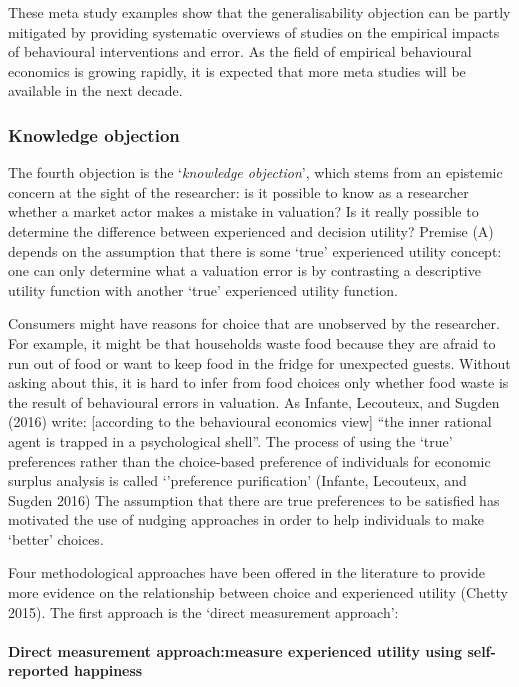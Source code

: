 \documentclass[
]{book}
\begin{document}
These meta study examples show that the generalisability objection can be partly mitigated by providing systematic overviews of studies on the empirical impacts of behavioural interventions and error. As the field of empirical behavioural economics is growing rapidly, it is expected that more meta studies will be available in the next decade.

\hypertarget{knowledge-objection}{%
\subsubsection{Knowledge objection}\label{knowledge-objection}}

The fourth objection is the `\emph{knowledge objection}', which stems from an epistemic concern at the sight of the researcher: is it possible to know as a researcher whether a market actor makes a mistake in valuation? Is it really possible to determine the difference between experienced and decision utility? Premise (A) depends on the assumption that there is some `true' experienced utility concept: one can only determine what a valuation error is by contrasting a descriptive utility function with another `true' experienced utility function.

Consumers might have reasons for choice that are unobserved by the researcher. For example, it might be that households waste food because they are afraid to run out of food or want to keep food in the fridge for unexpected guests. Without asking about this, it is hard to infer from food choices only whether food waste is the result of behavioural errors in valuation. As Infante, Lecouteux, and Sugden (2016) write: {[}according to the behavioural economics view{]} ``the inner rational agent is trapped in a psychological shell''. The process of using the `true' preferences rather than the choice-based preference of individuals for economic surplus analysis is called `'preference purification' (Infante, Lecouteux, and Sugden 2016) The assumption that there are true preferences to be satisfied has motivated the use of nudging approaches in order to help individuals to make `better' choices.

Four methodological approaches have been offered in the literature to provide more evidence on the relationship between choice and experienced utility (Chetty 2015). The first approach is the `direct measurement approach':

\hypertarget{direct-measurement-approachmeasure-experienced-utility-using-self-reported-happiness}{%
\paragraph{\texorpdfstring{\textbf{Direct measurement approach}:measure experienced utility using self-reported happiness}{Direct measurement approach:measure experienced utility using self-reported happiness}}\label{direct-measurement-approachmeasure-experienced-utility-using-self-reported-happiness}}
\end{document}
